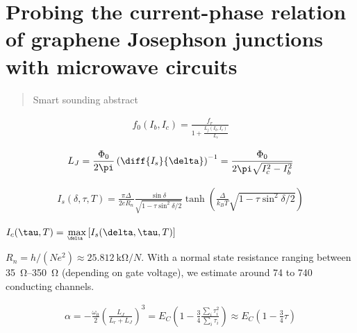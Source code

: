 \newchapstyle
\chapter{Probing the current-phase relation of graphene Josephson junctions
with microwave circuits}
\label{chap:gJJ-CPR}


\begin{abstract}
	Smart sounding abstract
\end{abstract}

\newpage

\begin{align}
f_0(I_b,I_c) = \frac{f_r}{1 +  \frac{L_j(I_b, I_c)}{L_r}}
\end{align}

\begin{align}
L_J = \frac{\Phi_0}{2\pi}\left(\diff{I_s}{\delta}\right)^{-1} = \frac{\Phi_0}{2\pi\sqrt{I_c^2-I_b^2}}
\end{align}

\begin{align}
I_s(\delta,\tau,T) = \frac{\pi\Delta}{2 e R_n} \frac{\sin\delta}{\sqrt{1 - \tau \sin^2\delta / 2}} \tanh\left(\frac{\Delta}{k_B T} \sqrt{1 - \tau \sin^2\delta / 2}\right)
\end{align}

$I_c(\tau,T)=\underaccent{\delta}{\max} \left[I_s(\delta,\tau,T)\right]$

$R_n= h/(Ne^2)\approx \SI{25.812}{\kilo\ohm} / N$.
%
With a normal state resistance ranging between \SIrange{35}{350}{\ohm} (depending on gate voltage), we estimate around 74 to 740 conducting channels.

\begin{align}
\alpha=-\frac{\omega_0}{2} \left(\frac{L_J}{L_r+L_J}\right)^3 = E_C \left( 1-\frac{3}{4}\frac{\sum_i\tau_i^2}{\sum_i\tau_i}\right) \approx E_C \left( 1-\frac{3}{4}\tau \right)
\end{align}
\cite{Zhou,Microsoft}





